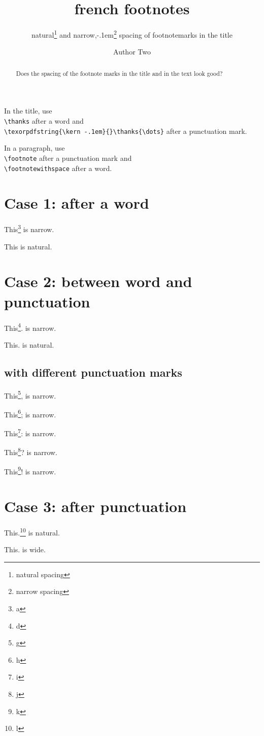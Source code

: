 \documentclass{snapshotmfo}
\author{%
natural\thanks{natural spacing} and
narrow,\texorpdfstring{\kern -.1em}{}\thanks{narrow spacing}
spacing of footnotemarks in the title
\and Author Two}
\title{french footnotes}
\begin{document}

\begin{abstract}
Does the spacing of the footnote marks in the title and in the text look good?
\end{abstract}

In the title, use\\
\verb+\thanks+ after a word and\\
\verb+\texorpdfstring{\kern -.1em}{}\thanks{\dots}+ after a punctuation mark.

In a paragraph, use\\
\verb+\footnote+ after a punctuation mark and\\
\verb+\footnotewithspace+ after a word.


\section{Case 1: after a word}

\noindent This\footnote{a} is narrow.

\noindent This is natural.


\section{Case 2: between word and punctuation}

\noindent This\footnote{d}. is narrow.

\noindent This. is natural.


\subsection{with different punctuation marks}

\noindent This\footnote{g}, is narrow.

\noindent This\footnote{h}; is narrow.

\noindent This\footnote{i}: is narrow.

\noindent This\footnote{j}? is narrow.

\noindent This\footnote{k}! is narrow.


\section{Case 3: after punctuation}

\noindent This.\footnote{l} is natural.

\noindent This. is wide.
\end{document}

